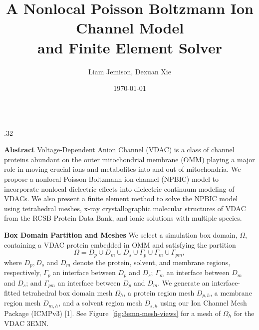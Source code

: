 \documentclass[10pt]{beamer}
\title[University of Wisconsin Milwaukee]{A Nonlocal Poisson Boltzmann Ion Channel Model \\and Finite Element Solver}
\author[]{Liam Jemison, Dexuan Xie}
\institute[]{University of Wisconsin-Milwaukee, Department of Mathematical Sciences, Milwaukee, Wisconsin}
\date[\textcolor{white}{\today} ]
{\today}
\begin{document}
  \begin{frame}{}
      \begin{columns}[t]
            \begin{column}{.32\linewidth}
                \begin{block}{ \centering \bf \large Abstract}
                    Voltage-Dependent Anion Channel (VDAC) is a class of channel proteins abundant on the outer mitochondrial membrane (OMM) playing a major role in moving crucial ions and metabolites into and out of mitochondria. We propose a nonlocal Poisson-Boltzmann ion channel (NPBIC) model to incorporate nonlocal dielectric effects into dielectric continuum modeling of VDACs. We also present a finite element method to solve the NPBIC model using tetrahedral meshes, x-ray crystallographic molecular structures of VDAC from the RCSB Protein Data Bank, and ionic solutions with multiple species.
                \end{block}
                \vspace{2mm}
                \begin{block}{\centering \bf \large  Box Domain Partition and Meshes}
                    We select a simulation box domain, $\Omega$, %
                    containing a VDAC protein embedded in OMM and satisfying the partition 
                    \begin{equation*}\label{DomainDecomp}
                    \Omega = D_p\cup D_{m} \cup  D_s \cup \Gamma_p \cup \Gamma_m \cup \Gamma_{pm},
                    \end{equation*}
                    where $D_p, D_s$ and $D_m$ denote the protein, solvent, and membrane regions, respectively, $\Gamma_p$ an interface between $D_p$ and $D_s$; $\Gamma_m $ an interface between $D_{m}$ and $D_s$; and $\Gamma_{pm}$ an interface between $D_p$ and $D_m$. We generate an interface-fitted tetrahedral box domain mesh $\Omega_h$, a protein region mesh $D_{p,h}$, a membrane region mesh $D_{m,h}$, and a solvent region mesh $D_{s,h}$ using our Ion Channel Mesh Package (ICMPv3) [1]. See Figure~\ref{fig:3emn-mesh-views} for a mesh of $\Omega_h$ for the VDAC 3EMN.
                    

\end{block}
\end{column}
\end{columns}
\end{frame}
\end{document}
